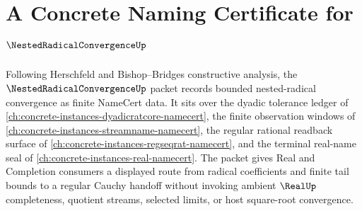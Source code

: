 \chapter{A Concrete Naming Certificate for $\NestedRadicalConvergenceUp$}
\label{ch:concrete-instances-nested-radical-convergence-namecert}

Following Herschfeld and Bishop--Bridges constructive analysis, the $\NestedRadicalConvergenceUp$ packet records bounded nested-radical convergence as finite NameCert data. It sits over the dyadic tolerance ledger of \autoref{ch:concrete-instances-dyadicratcore-namecert}, the finite observation windows of \autoref{ch:concrete-instances-streamname-namecert}, the regular rational readback surface of \autoref{ch:concrete-instances-regseqrat-namecert}, and the terminal real-name seal of \autoref{ch:concrete-instances-real-namecert}. The packet gives Real and Completion consumers a displayed route from radical coefficients and finite tail bounds to a regular Cauchy handoff without invoking ambient $\RealUp$ completeness, quotient streams, selected limits, or host square-root convergence.


